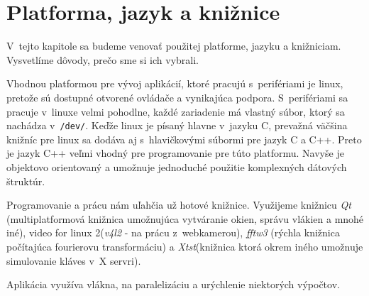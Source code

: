 \chapter{Platforma, jazyk a knižnice}

V~tejto kapitole sa budeme venovať použitej platforme, jazyku a knižniciam. Vysvetlíme dôvody, prečo sme si ich vybrali.
\bigskip

Vhodnou platformou pre vývoj aplikácií, ktoré pracujú s~perifériami je linux, pretože sú dostupné otvorené ovládače a vynikajúca podpora. S~perifériami sa pracuje v~linuxe velmi pohodlne, každé zariadenie má vlastný súbor, ktorý sa nachádza v~{\tt /dev/}.
Keďže linux je písaný hlavne v~jazyku C, prevažná väčšina knižníc pre linux sa dodáva aj s~hlavičkovými súbormi pre jazyk C a C++.
Preto je jazyk C++ veľmi vhodný pre programovanie pre túto platformu. Navyše je objektovo orientovaný a umožnuje jednoduché použitie komplexných dátových štruktúr.

Programovanie a prácu nám uľahčia už hotové knižnice. Využijeme knižnicu \textit{Qt} (multiplatformová knižnica umožnujúca vytváranie okien, správu vlákien a mnohé iné),
video for linux 2(\textit{v4l2} - na prácu z~webkamerou), \textit{fftw3} (rýchla knižnica počítajúca fourierovu transformáciu) a \textit{Xtst}(knižnica ktorá okrem iného umožnuje simulovanie kláves v~X servri).

Aplikácia využíva vlákna, na paralelizáciu a urýchlenie niektorých výpočtov.
